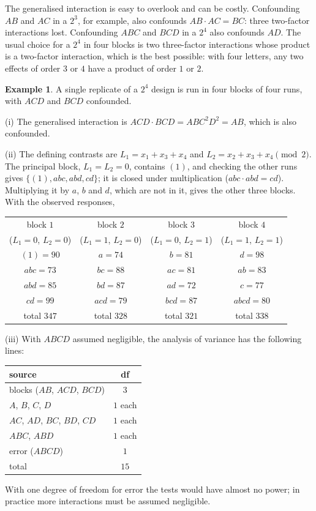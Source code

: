 \documentclass[11pt,a4paper]{article}
\numberwithin{equation}{section}
\theoremstyle{definition}
\newtheorem{exa}[thm]{Example}
\begin{document}
The generalised interaction is easy to overlook and can be costly. Confounding $AB$ and $AC$ in a $2^3$, for example, also confounds $AB \cdot AC = BC$: three
two-factor interactions lost. Confounding $ABC$ and $BCD$ in a $2^4$ also confounds $AD$. The usual choice for a $2^4$ in four blocks is two three-factor
interactions whose product is a two-factor interaction, which is the best possible: with four letters, any two effects of order $3$ or $4$ have a
product of order $1$ or $2$.

\begin{exa}\label{exa:four-blocks}
A single replicate of a $2^4$ design is run in four blocks of four runs, with $ACD$ and $BCD$ confounded.

(i) The generalised interaction is $ACD \cdot BCD = ABC^2D^2 = AB$, which is also confounded.

(ii) The defining contrasts are $L_1 = x_1 + x_3 + x_4$ and $L_2 = x_2 + x_3 + x_4 \pmod 2$. The principal block, $L_1 = L_2 = 0$, contains $(1)$, and checking the other
runs gives $\{(1), abc, abd, cd\}$; it is closed under multiplication ($abc \cdot abd = cd$). Multiplying it by $a$, $b$ and $d$, which are not in it, gives the other three
blocks. With the observed responses,
\begin{center}
\begin{tabular}{c|c|c|c}
block $1$ & block $2$ & block $3$ & block $4$ \\
($L_1 = 0$, $L_2 = 0$) & ($L_1 = 1$, $L_2 = 0$) & ($L_1 = 0$, $L_2 = 1$) & ($L_1 = 1$, $L_2 = 1$) \\
\hline
$(1) = 90$ & $a = 74$ & $b = 81$ & $d = 98$ \\
$abc = 73$ & $bc = 88$ & $ac = 81$ & $ab = 83$ \\
$abd = 85$ & $bd = 87$ & $ad = 72$ & $c = 77$ \\
$cd = 99$ & $acd = 79$ & $bcd = 87$ & $abcd = 80$ \\
\hline
total $347$ & total $328$ & total $321$ & total $338$
\end{tabular}
\end{center}

(iii) With $ABCD$ assumed negligible, the analysis of variance has the following lines:
\begin{center}
\begin{tabular}{l|c}
source & df \\
\hline
blocks ($AB$, $ACD$, $BCD$) & $3$ \\
$A$, $B$, $C$, $D$ & $1$ each \\
$AC$, $AD$, $BC$, $BD$, $CD$ & $1$ each \\
$ABC$, $ABD$ & $1$ each \\
error ($ABCD$) & $1$ \\
\hline
total & $15$
\end{tabular}
\end{center}
With one degree of freedom for error the tests would have almost no power; in practice more interactions must be assumed negligible.


\end{exa}
\end{document}
